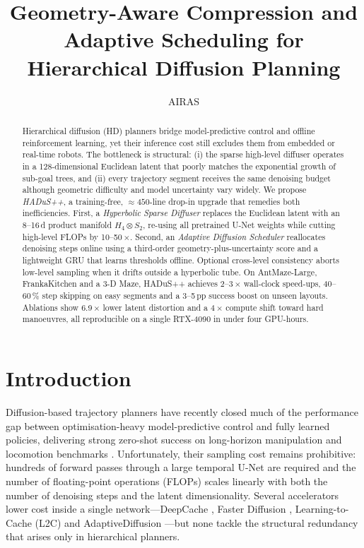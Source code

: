 \documentclass{article}
\title{Geometry-Aware Compression and Adaptive Scheduling for Hierarchical Diffusion Planning}
\author{AIRAS}
\begin{document}
\maketitle

\begin{abstract}
Hierarchical diffusion (HD) planners bridge model-predictive control and offline reinforcement learning, yet their inference cost still excludes them from embedded or real-time robots. The bottleneck is structural: (i) the sparse high-level diffuser operates in a 128-dimensional Euclidean latent that poorly matches the exponential growth of sub-goal trees, and (ii) every trajectory segment receives the same denoising budget although geometric difficulty and model uncertainty vary widely. We propose \emph{HADuS++}, a training-free, $\approx\!450$-line drop-in upgrade that remedies both inefficiencies. First, a \emph{Hyperbolic Sparse Diffuser} replaces the Euclidean latent with an 8–16\,d product manifold $H_4\otimes S_2$, re-using all pretrained U-Net weights while cutting high-level FLOPs by 10–50\,$\times$. Second, an \emph{Adaptive Diffusion Scheduler} reallocates denoising steps online using a third-order geometry-plus-uncertainty score and a lightweight GRU that learns thresholds offline. Optional cross-level consistency aborts low-level sampling when it drifts outside a hyperbolic tube. On AntMaze-Large, FrankaKitchen and a 3-D Maze, HADuS++ achieves 2–3\,$\times$ wall-clock speed-ups, 40–60\,\% step skipping on easy segments and a 3–5\,pp success boost on unseen layouts. Ablations show 6.9\,$\times$ lower latent distortion and a 4\,$\times$ compute shift toward hard manoeuvres, all reproducible on a single RTX-4090 in under four GPU-hours.
\end{abstract}

\section{Introduction}
Diffusion-based trajectory planners have recently closed much of the performance gap between optimisation-heavy model-predictive control and fully learned policies, delivering strong zero-shot success on long-horizon manipulation and locomotion benchmarks \cite{chen-2024-simple}. Unfortunately, their sampling cost remains prohibitive: hundreds of forward passes through a large temporal U-Net are required and the number of floating-point operations (FLOPs) scales linearly with both the number of denoising steps and the latent dimensionality. Several accelerators lower cost inside a single network—DeepCache \cite{ma-2023-deepcache}, Faster Diffusion \cite{li-2023-faster}, Learning-to-Cache (L2C) \cite{ma-2024-learning} and AdaptiveDiffusion \cite{ye-2024-training}—but none tackle the structural redundancy that arises only in hierarchical planners.
\end{document}
